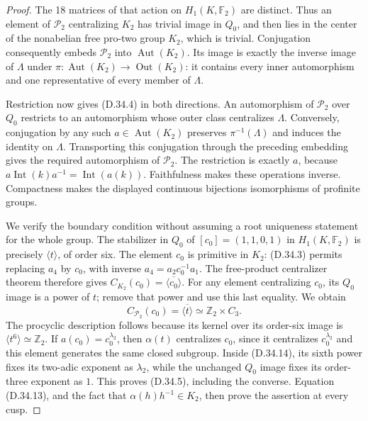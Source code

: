 \begin{proof}
The 18 matrices of that action on $H_1(K,\mathbb F_2)$ are distinct.
Thus an element of $\mathcal P_2$ centralizing $K_2$ has trivial
image in $Q_0$, and then lies in the center of the nonabelian free
pro-two group $K_2$, which is trivial. Conjugation consequently embeds
$\mathcal P_2$ into $\operatorname{Aut}(K_2)$. Its image is exactly
the inverse image of $\Lambda$ under
$\pi:\operatorname{Aut}(K_2)\to\operatorname{Out}(K_2)$: it contains
every inner automorphism and one representative of every member of
$\Lambda$.

Restriction now gives (D.34.4) in both directions. An automorphism of
$\mathcal P_2$ over $Q_0$ restricts to an automorphism whose outer class
centralizes $\Lambda$. Conversely, conjugation by any such
$a\in\operatorname{Aut}(K_2)$ preserves $\pi^{-1}(\Lambda)$ and
induces the identity on $\Lambda$. Transporting this conjugation
through the preceding embedding gives the required automorphism of
$\mathcal P_2$. The restriction is exactly $a$, because
$a\operatorname{Int}(k)a^{-1}=\operatorname{Int}(a(k))$.
Faithfulness makes these operations inverse. Compactness makes the
displayed continuous bijections isomorphisms of profinite groups.

We verify the boundary condition without assuming a root uniqueness
statement for the whole group. The stabilizer in $Q_0$ of
$[c_0]=(1,1,0,1)$ in $H_1(K,\mathbb F_2)$ is precisely
$\langle t\rangle$, of order six. The element $c_0$ is primitive in
$K_2$: (D.34.3) permits replacing $a_4$ by $c_0$, with inverse
$a_4=a_2c_0^{-1}a_1$. The free-product centralizer theorem
\cite[Theorem B$'$]{A_HerfortRibes1985} therefore gives
$C_{K_2}(c_0)=\overline{\langle c_0\rangle}$.
For any element centralizing $c_0$, its $Q_0$ image is a power of $t$;
remove that power and use this last equality. We obtain
\[
 C_{\mathcal P_2}(c_0)=\overline{\langle t\rangle}
                      \simeq\mathbb Z_2\times C_3.    \tag{D.34.14}
\]
The procyclic description follows because its kernel over its order-six
image is $\langle t^6\rangle\simeq\mathbb Z_2$. If
$a(c_0)=c_0^{\lambda_2}$, then $\alpha(t)$ centralizes $c_0$, since
it centralizes $c_0^{\lambda_2}$ and this element generates the same
closed subgroup. Inside (D.34.14), its sixth power fixes its two-adic
exponent as $\lambda_2$, while the unchanged $Q_0$ image fixes its
order-three exponent as $1$. This proves (D.34.5), including the
converse. Equation (D.34.13), and the fact that $\alpha(h)h^{-1}\in K_2$,
then prove the assertion at every cusp.


\end{proof}
